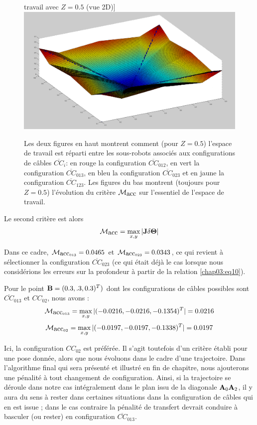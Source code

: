 \begin{figure}[!htp]
travail avec $Z = 0.5$ (vue 2D)]{\label{chap03:fig5view3}
    \includegraphics[width=.45\linewidth]{./chapter03/figures/crit_acc03.png}}
    \caption{\footnotesize Les deux figures en haut montrent comment (pour 
$Z = 0.5$) l'espace de travail est r\'eparti entre les sous-robots associ\'es 
aux configurations de c\^ables $\overline{CC}_i$: en rouge la configuration 
$\overline{CC}_{012}$, en vert la configuration $\overline{CC}_{013}$, en bleu 
la configuration $\overline{CC}_{023}$ et en jaune la configuration 
$\overline{CC}_{123}$. Les figures du bas montrent (toujours pour $Z = 0.5$) 
l'\'evolution du crit\`ere $\mathcal M_{\hbox{acc}}$ sur l'essentiel de 
l'espace de travail.}
\label{chap03:fig5}
\end{figure}

Le second crit\`ere est alors
\begin{equation}
\mathcal M_{\hbox{acc}} = \max_{x,y} |{\bf J} \delta {\bf \Theta}|
\label{chap03:eq11}
\end{equation}

Dans ce cadre, $\mathcal M_{\hbox{acc}_{013}} = 0.0465$ et 
$\mathcal M_{\hbox{acc}_{023}} = 0.0343$, ce qui revient \`a s\'electionner la 
configuration $\overline{CC}_{023}$ (ce qui \'etait d\'ej\`a le cas lorsque 
nous consid\'erions les erreurs sur la profondeur \`a partir de la relation 
\ref{chap03:eq10}).

Pour le point ${\bf B} = (0.3,.3,0.3)^T)$ dont les configurations de c\^ables 
possibles sont $\overline{CC}_{013}$ et $CC_{02}$, nous avons :
$$\mathcal M_{\hbox{acc}_{013}} = \max_{x,y} |(-0.0216,-0.0216,-0.1354)^T| = 
0.0216$$ 
$$\mathcal M_{\hbox{acc}_{02}} = \max_{x,y} |( -0.0197, -0.0197, -0.1338)^T| 
= 0.0197$$

Ici, la configuration $CC_{02}$ est pr\'ef\'er\'ee. Il s'agit toutefois d'un 
crit\`ere \'etabli pour une pose donn\'ee, alors que nous \'evoluons dans le 
cadre d'une trajectoire. Dans l'algorithme final qui sera pr\'esent\'e et 
illustr\'e en fin de chapitre, nous ajouterons une p\'enalit\'e \`a tout 
changement de configuration. Ainsi, si la trajectoire se d\'eroule dans notre 
cas int\'egralement dans le plan issu de la diagonale ${\bf A}_0{\bf A}_2$, il 
y aura du sens \`a rester dans certaines situations dans la configuration de 
c\^ables qui en est issue ; dans le cas contraire la p\'enalit\'e de transfert 
devrait conduire \`a basculer (ou rester) en configuration 
$\overline{CC}_{013}$.

